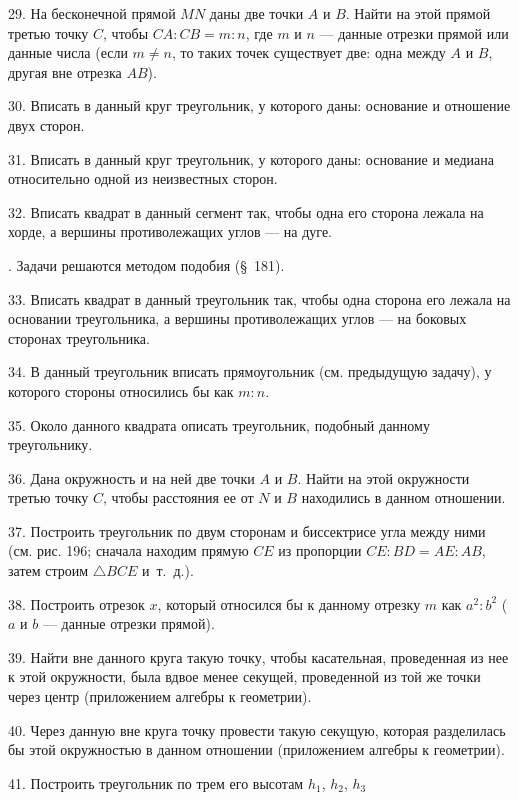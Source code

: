 \documentclass[oneside]{book}
\begin{document}
29.
На бесконечной прямой $MN$ даны две точки $A$ и $B$.
Найти на этой прямой третью точку $C$, чтобы $CA:CB=m:n$, где $m$ и $n$ — данные отрезки прямой или данные числа (если $m\ne n$, то таких точек существует две:
одна между $A$ и $B$, другая вне отрезка $AB$).

30.
Вписать в данный круг треугольник, у которого даны:
основание и отношение двух сторон.

31.
Вписать в данный круг треугольник, у которого даны:
основание и медиана относительно одной из неизвестных сторон. %

32.
Вписать квадрат в данный сегмент так, чтобы одна его сторона лежала на хорде, а вершины противолежащих углов — на дуге.

.
Задачи решаются методом подобия (§~181).

33.
Вписать квадрат в данный треугольник так, чтобы одна сторона его лежала на основании треугольника, а вершины противолежащих углов — на боковых сторонах треугольника.

34.
В данный треугольник вписать прямоугольник (см. предыдущую задачу), у которого стороны относились бы как $m:n$.

35.
Около данного квадрата описать треугольник, подобный данному треугольнику.

36.
Дана окружность и на ней две точки $A$ и $B$.
Найти на этой окружности третью точку $C$, чтобы расстояния ее от $N$ и $B$ находились в данном отношении.

37.
Построить треугольник по двум сторонам и биссектрисе угла между ними (см. рис. 196;
сначала находим прямую $CE$ из пропорции $CE:BD=AE:AB$, затем строим $\triangle BCE$ и~т.~д.).

38.
Построить отрезок $x$, который относился бы к данному отрезку $m$ как $a^2:b^2$ ($a$ и $b$ — данные отрезки прямой).

39.
Найти вне данного круга такую точку, чтобы касательная, проведенная из нее к этой окружности, была вдвое менее секущей, проведенной из той же точки через центр (приложением алгебры к геометрии).

40.
Через данную вне круга точку провести такую секущую, которая разделилась бы этой окружностью в данном отношении (приложением алгебры к геометрии).

41.
Построить треугольник по трем его высотам $h_1$, $h_2$, $h_3$
\end{document}
